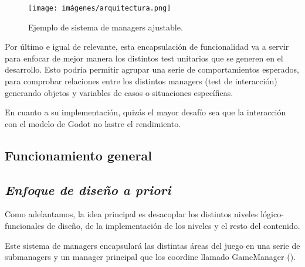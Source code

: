 \begin{figure}[ht]
	\centering
	\texttt{[image: imágenes/arquitectura.png]}
	\caption{Ejemplo de sistema de managers ajustable.}
\end{figure}

Por último e igual de relevante, esta encapsulación de funcionalidad va a servir para enfocar de mejor manera los distintos test unitarios que se generen en el desarrollo. Esto podría permitir agrupar una serie de comportamientos esperados, para comprobar relaciones entre los distintos managers (test de interacción) generando objetos y variables de casos o situaciones específicas.

En cuanto a su implementación, quizás el mayor desafío sea que la interacción con el modelo de Godot no lastre el rendimiento.

\subsection{Funcionamiento general}\label{modelado:funcionamiento-general}
\subsection*{\noindent\normalfont\textit{Enfoque de diseño a priori}}

Como adelantamos, la idea principal es desacoplar los distintos niveles lógico-funcionales de diseño, de la implementación de los niveles y el resto del contenido.

Este sistema de managers encapsulará las distintas áreas del juego en una serie de submanagers y un manager principal que los coordine llamado GameManager ().

